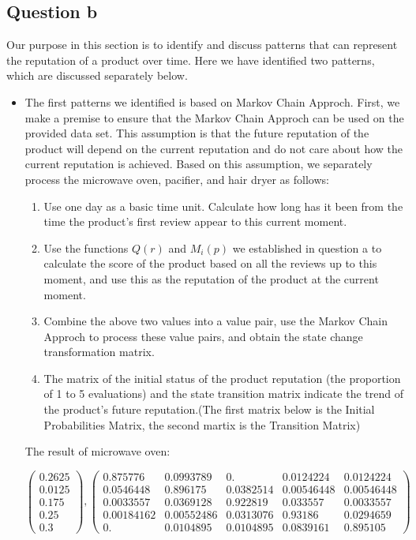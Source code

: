 \documentclass[12pt]{mcmthesis}
\begin{document}
\subsection{Question b}
Our purpose in this section is to identify and discuss patterns that can represent the reputation of a product over time. Here we have identified two patterns, which are discussed separately below.
\begin{itemize}
	\item The first patterns we identified is based on Markov Chain Approch\cite{3}. First, we make a premise to ensure that the Markov Chain Approch can be used on the provided data set. This assumption is that the future reputation of the product will depend on the current reputation and do not care about how the current reputation is achieved. Based on this assumption, we separately process the microwave oven, pacifier, and hair dryer as follows:
	\begin{enumerate}
		\item Use one day as a basic time unit. Calculate how long has it been from the time the product's first review appear to this current moment.
		
		\item Use the functions $Q(r)$ and $M_{i}(p)$ we established in question a to calculate the score of the product based on all the reviews up to this moment, and use this as the reputation of the product at the current moment.
		
		\item Combine the above two values into a value pair, use the Markov Chain Approch to process these value pairs, and obtain the state change transformation matrix.
		
		\item The matrix of the initial status of the product reputation (the proportion of 1 to 5 evaluations) and the state transition matrix indicate the trend of the product's future reputation.(The first matrix below is the Initial Probabilities Matrix, the second martix is the Transition Matrix)
	\end{enumerate}
    The result of microwave oven:
    
    $$\left(\begin{array}{c}
    0.2625 \\
    0.0125 \\
    0.175 \\
    0.25 \\
    0.3
    \end{array}\right) , \left(\begin{array}{ccccc}
    0.875776 & 0.0993789 & 0. & 0.0124224 & 0.0124224 \\
    0.0546448 & 0.896175 & 0.0382514 & 0.00546448 & 0.00546448 \\
    0.0033557 & 0.0369128 & 0.922819 & 0.033557 & 0.0033557 \\
    0.00184162 & 0.00552486 & 0.0313076 & 0.93186 & 0.0294659 \\
    0. & 0.0104895 & 0.0104895 & 0.0839161 & 0.895105
    \end{array}\right)$$


\end{itemize}
\end{document}
